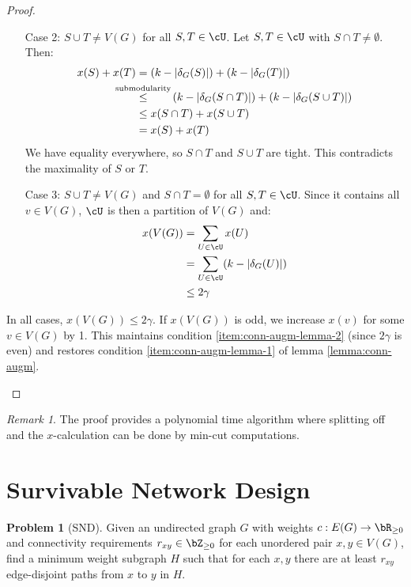 \documentclass[11pt, a4paper]{article}
\newcommand{\stackalign}[2]{\stackrel{\mathclap{#1}}{#2}}
\newcommand{\abs}[1]{\left\lvert#1\right\rvert}
\theoremstyle{remark}
\newtheorem*{uremark}{Remark}
\theoremstyle{definition}
\newtheorem*{problem}{Problem}
\begin{document}
\begin{proof}
\begin{enumerate}
\begin{enumerate}
			\item[Case 2:] $S\cup T\neq V(G)$ for all $S,T\in\cU$. Let $S,T\in\cU$ with
			$S\cap T\neq\emptyset$. Then:
			\begin{align*}
				x(S)+x(T) & =(k-\abs{\delta_G(S)})+(k-\abs{\delta_G(T)})  \\
				          & \stackalign{\text{submodularity}}{\leq}\qquad
				(k-\abs{\delta_G(S\cap T)})+(k-\abs{\delta_G(S\cup T)})   \\
				          & \leq x(S\cap T)+x(S\cup T)                    \\
				          & =x(S)+x(T)
			\end{align*}
			We have equality everywhere, so $S\cap T$ and $S\cup T$ are tight.
			This contradicts the maximality of $S$ or $T$.

			\item[Case 3:] $S\cup T\neq V(G)$ and $S\cap T=\emptyset$ for all
			$S,T\in\cU$. Since it contains all $v\in V(G)$, $\cU$ is then a
			partition of $V(G)$ and:
			\begin{align*}
				x(V(G)) & =\sum_{U\in\cU}x(U)                  \\
				        & =\sum_{U\in\cU}(k-\abs{\delta_G(U)}) \\
				        & \leq 2\gamma
			\end{align*}
		\end{enumerate}
		In all cases, $x(V(G))\leq 2\gamma$. If $x(V(G))$ is odd, we increase
		$x(v)$ for some $v\in V(G)$ by 1. This maintains condition
		\ref{item:conn-augm-lemma-2} (since $2\gamma$ is even) and
		restores condition \ref{item:conn-augm-lemma-1} of lemma
		\ref{lemma:conn-augm}.
	\end{enumerate}
\end{proof}

\begin{uremark}
	The proof provides a polynomial time algorithm where splitting off and
	the $x$-calculation can be done by min-cut computations.
\end{uremark}

\section{Survivable Network Design}

\begin{problem}[SND]
Given an undirected graph $G$ with weights $c: E(G)\to\bR_{\geq0}$ and
connectivity requirements $r_{xy}\in\bZ_{\geq0}$ for each unordered
pair $x,y\in V(G)$, find a minimum weight subgraph $H$ such that for
each $x,y$ there are at least $r_{xy}$ edge-disjoint paths from $x$ to
$y$ in $H$.
\end{problem}
\end{document}
